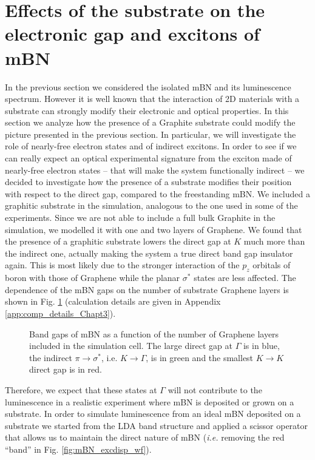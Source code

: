 %
\section{Effects of the substrate on the electronic gap and excitons of mBN} \label{sec:substrate}
In the previous section we considered the isolated \acrshort{mBN} and its luminescence spectrum. However it is well known that the interaction of 2D materials with a substrate can strongly modify their electronic and optical properties. In this section we analyze how the presence of a Graphite substrate could modify the picture presented in the previous section. In particular, we will investigate the role of nearly-free electron states and of indirect excitons.
In order to see if we can really expect an optical experimental signature from the exciton made of nearly-free electron states -- that will make the system functionally indirect -- we decided to investigate how the presence of a substrate modifies their position with respect to the direct gap, compared to the freestanding mBN. We included a graphitic substrate in the simulation, analogous to the one used in some of the experiments. Since we are not able to include a full bulk Graphite in the simulation, we modelled it with one and two layers of Graphene. We found that the presence of a graphitic substrate lowers the direct gap at $K$ much more than the indirect one, actually making the system a true direct band gap insulator again. This is most likely due to the stronger interaction of the $p_z$ orbitals of boron with those of Graphene while the planar $\sigma^*$ states are less affected. The dependence of the mBN gaps on the number of substrate Graphene layers is shown in Fig. \ref{fig:mBN_gap_layers} (calculation details are given in Appendix \ref{app:comp_details_Chapt3}). 
\begin{figure}[H]
	\vspace{0.2cm}
	\setcapindent{2em}
	\centering
	 \qquad
	\caption{Band gaps of mBN as a function of the number of Graphene layers\label{gap_vs_layers} included in the simulation cell. The large direct gap at $\Gamma$ is in blue, the indirect $\pi\rightarrow\sigma^*$, i.e. $K\rightarrow\Gamma$, is in green and the smallest $K\rightarrow K$ direct gap is in red.} 
	\label{fig:mBN_gap_layers}
\end{figure}
Therefore, we expect that these states at $\Gamma$ will not contribute to the luminescence in a realistic experiment where mBN is deposited or grown on a substrate.
In order to simulate luminescence from an ideal mBN deposited on a substrate we started from the LDA band structure and applied a scissor operator that allows us to maintain the direct nature of mBN (\textit{i.e.} removing the red ``band'' in Fig. \ref{fig:mBN_excdisp_wf}).\\ 


